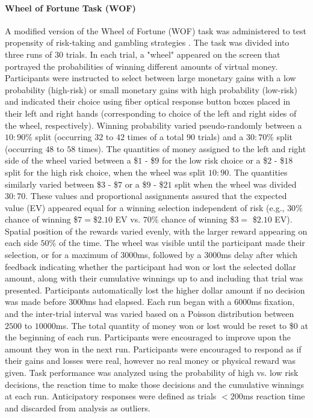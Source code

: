 \documentclass[utf8]{frontiersSCNS} %
\begin{document}
\paragraph{Wheel of Fortune Task (WOF)} A modified version of the Wheel of Fortune (WOF) task was administered to test propensity of risk-taking and gambling strategies \citep{ernst2004wheeloffortune}. The task was divided into three runs of 30 trials. In each trial, a "wheel" appeared on the screen that portrayed the probabilities of winning different amounts of virtual money. Participants were instructed to select between large monetary gains with a low probability (high-risk) or small monetary gains with high probability (low-risk) and indicated their choice using fiber optical response button boxes placed in their left and right hands (corresponding to choice of the left and right sides of the wheel, respectively). Winning probability varied pseudo-randomly between a $10:90\%$ split (occurring $32$ to $42$ times of a total $90$ trials) and a $30:70\%$ split (occurring $48$ to $58$ times). The quantities of money assigned to the left and right side of the wheel varied between a \$$1$ - \$$9$ for the low risk choice or a \$$2$ - \$$18$ split for the high risk choice, when the wheel was split $10:90$. The quantities similarly varied between \$$3$ - \$$7$ or a \$$9$ - \$$21$ split when the wheel was divided $30:70$.  These values and proportional assignments assured that the expected value (EV) appeared equal for a winning selection independent of risk (e.g., $30\%$ chance of winning \$$7 = $\$$2.10$ EV vs. $70\%$ chance of winning \$$3 =$ \$$2.10$ EV).  Spatial position of the rewards varied evenly, with the larger reward appearing on each side $50\%$ of the time.  The wheel was visible until the participant made their selection, or for a maximum of $3000$ms, followed by a $3000$ms delay after which feedback indicating whether the participant had won or lost the selected dollar amount, along with their cumulative winnings up to and including that trial was presented.  Participants automatically lost the higher dollar amount if no decision was made before $3000$ms had elapsed.  Each run began with a $6000$ms fixation, and the inter-trial interval was varied based on a Poisson distribution between $2500$ to $10000$ms. The total quantity of money won or lost would be reset to \$$0$ at the beginning of each run. Participants were encouraged to improve upon the amount they won in the next run.  Participants were encouraged to respond as if their gains and losses were real, however no real money or physical reward was given. Task performance was analyzed using the probability of high vs. low risk decisions, the reaction time to make those decisions and the cumulative winnings at each run. Anticipatory responses were defined as trials $<200$ms reaction time and discarded from analysis as outliers.
\end{document}
